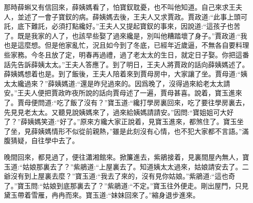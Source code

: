 \begin{parag}
    那時薛蝌又有信回來，薛姨媽看了，怕寶釵耽憂，也不叫他知道。自己來求王夫人，並述了一會子寶釵的病。薛姨媽去後，王夫人又求賈政。賈政道:“此事上頭可託，底下難託，必須打點纔好。”王夫人又提起寶釵的事來，因說道:“這孩子也苦了。既是我家的人了，也該早些娶了過來纔是，別叫他糟踏壞了身子。”賈政道:“我也是這麼想。但是他家亂忙，況且如今到了冬底，已經年近歲逼，不無各自要料理些家務。今冬且放了定，明春再過禮，過了老太太的生日，就定日子娶。你把這番話先告訴薛姨太太。”王夫人答應了。到了明日，王夫人將賈政的話向薛姨媽述了。薛姨媽想着也是。到了飯後，王夫人陪着來到賈母房中，大家讓了坐。賈母道:“姨太太纔過來？”薛姨媽道:“還是昨兒過來的。因爲晚了，沒得過來給老太太請安。”王夫人便把賈政昨夜所說的話向賈母述了一遍，賈母甚喜。說着，寶玉進來了。賈母便問道:“吃了飯了沒有？”寶玉道:“纔打學房裏回來，吃了要往學房裏去，先見見老太太。又聽見說姨媽來了，過來給姨媽請請安。”因問:“寶姐姐可大好了？”薛姨媽笑道:“好了。”原來方纔大家正說着，見寶玉進來，都煞住了。寶玉坐了坐，見薛姨媽情形不似從前親熱，”雖是此刻沒有心情，也不犯大家都不言語。”滿腹猜疑，自往學中去了。
\end{parag}


\begin{parag}
    晚間回來，都見過了，便往瀟湘館來。掀簾進去，紫鵑接着，見裏間屋內無人，寶玉道:“姑娘那裏去了？”紫鵑道:“上屋裏去了。知道姨太太過來，姑娘請安去了。二爺沒有到上屋裏去麼？”寶玉道:“我去了來的，沒有見你姑娘。”紫鵑道:“這也奇了。”寶玉問:“姑娘到底那裏去了？”紫鵑道:“不定。”寶玉往外便走。剛出屋門，只見黛玉帶着雪雁，冉冉而來。寶玉道:“妹妹回來了。”縮身退步進來。
\end{parag}


